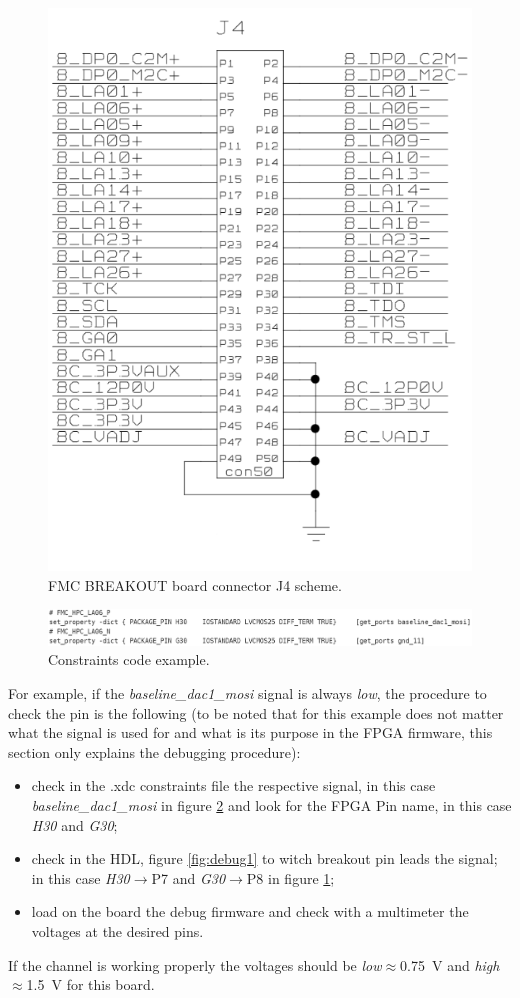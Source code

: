 \begin{figure}[H]
	\centering
	\includegraphics[width=0.45\linewidth]{IMG/ch3/DEBUG2}
	\caption{FMC BREAKOUT board connector J4 scheme.}
	\label{fig:debug2}
\end{figure}
\begin{figure}[H]
\centering
\includegraphics[width=0.9\linewidth]{IMG/ch3/DEBUG3}
\caption{Constraints code example.}
\label{fig:debug3}
\end{figure}
\noindent For example, if the \textit{baseline\_dac1\_mosi} signal is always \textit{low}, the procedure to check the pin is the following (to be noted that for this example does not matter what the signal is used for and what is its purpose in the FPGA firmware, this section only explains the debugging procedure):
\begin{itemize}
	\item check in the .xdc constraints file the respective signal, in this case \textit{baseline\_dac1\_mosi} in figure \ref{fig:debug3} and look for the FPGA Pin name, in this case \textit{H30} and \textit{G30};
	\item check in the HDL, figure \ref{fig:debug1} to witch breakout pin leads the signal; in this case \textit{H30}$\rightarrow$P7 and \textit{G30}$\rightarrow$P8 in figure \ref{fig:debug2};
	\item load on the board the debug firmware and check with a multimeter the voltages at the desired pins.    
\end{itemize}
\noindent If the channel is working properly the voltages should be \textit{low}$\approx$0.75~V and \textit{high}$\approx$1.5~V for this board.  
































